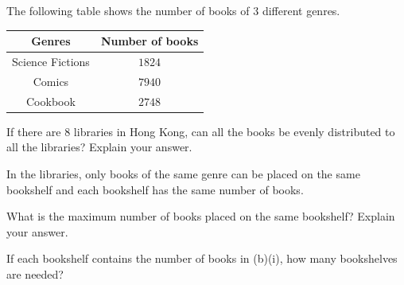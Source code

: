  The following table shows the number of books of $3$ different genres.

\begin{center}
\small
\begin{tabular}{|c|c|}
\hline
\textbf{Genres} & \textbf{Number of books} \\
\hline
Science Fictions & $1824$ \\
\hline
Comics & $7940$ \\
\hline
Cookbook & $2748$ \\
\hline
\end{tabular}
\end{center}

\begin{subparts}
  \item If there are $8$ libraries in Hong Kong, can all the books be evenly distributed to all the libraries? Explain your answer.

  \item In the libraries, only books of the same genre can be placed on the same bookshelf and each bookshelf has the same number of books.
  \begin{subpartsii}[1]
    \item What is the maximum number of books placed on the same bookshelf? Explain your answer.
    \item If each bookshelf contains the number of books in (b)(i), how many bookshelves are needed?
  \end{subpartsii}
\end{subparts}

